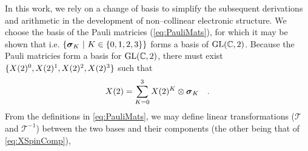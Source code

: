In this work, we rely on a change of basis to simplify the subsequent derivations and arithmetic in the development
of non--collinear electronic structure. We choose the basis of the Pauli matricies (\cref{eq:PauliMats}), for which it may
be shown that 
i.e. $\left\lbrace \pauli{K} \text{ }\vert\text{ } K \in \{0,1,2,3\} \right\rbrace$ forms a basis of  $\GL{C}{2}$.
Because the Pauli matricies form a basis for $\GL{C}{2}$, there must exist $\{ \spinor{2}{X}^0, \spinor{2}{X}^1, \spinor{2}{X}^2, \spinor{2}{X}^3 \}$
such that
\begin{equation}
\label{eq:XPauliBasis}
\spinor{2}{X} = \sum_{K = 0 }^3 \spinor{2}{X}^K \otimes \pauli{K} \quad.
\end{equation}
From the definitions in \cref{eq:PauliMats}, we may define linear transformations ($\mathscr{T}$ and $\mathscr{T}^{-1}$) between the two bases and their
components (the other being that of \cref{eq:XSpinComp}),
